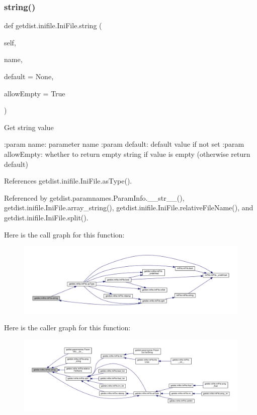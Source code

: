 \subsubsection{\texorpdfstring{string()}{string()}}
{\footnotesize\ttfamily def getdist.\+inifile.\+Ini\+File.\+string (\begin{DoxyParamCaption}\item[{}]{self,  }\item[{}]{name,  }\item[{}]{default = {\ttfamily None},  }\item[{}]{allow\+Empty = {\ttfamily True} }\end{DoxyParamCaption})}

\begin{DoxyVerb}Get string value

:param name: parameter name
:param default: default value if not set
:param allowEmpty: whether to return empty string if value is empty (otherwise return default)
\end{DoxyVerb}
 

References getdist.\+inifile.\+Ini\+File.\+as\+Type().



Referenced by getdist.\+paramnames.\+Param\+Info.\+\_\+\+\_\+str\+\_\+\+\_\+(), getdist.\+inifile.\+Ini\+File.\+array\+\_\+string(), getdist.\+inifile.\+Ini\+File.\+relative\+File\+Name(), and getdist.\+inifile.\+Ini\+File.\+split().

Here is the call graph for this function\+:
\nopagebreak
\begin{figure}[H]
\begin{center}
\leavevmode
\includegraphics[width=350pt]{classgetdist_1_1inifile_1_1IniFile_aaff273830dd59c896a75b71391677d99_cgraph}
\end{center}
\end{figure}
Here is the caller graph for this function\+:
\nopagebreak
\begin{figure}[H]
\begin{center}
\leavevmode
\includegraphics[width=350pt]{classgetdist_1_1inifile_1_1IniFile_aaff273830dd59c896a75b71391677d99_icgraph}
\end{center}
\end{figure}


